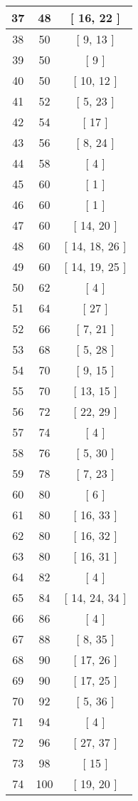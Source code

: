 \begin{center}
\begin{longtable}[H]{|| c c c ||}
37 & 48 & [ 16, 22 ]
\\\hline
38 & 50 & [ 9, 13 ]
\\\hline
39 & 50 & [ 9 ]
\\\hline
40 & 50 & [ 10, 12 ]
\\\hline
41 & 52 & [ 5, 23 ]
\\\hline
42 & 54 & [ 17 ]
\\\hline
43 & 56 & [ 8, 24 ]
\\\hline
44 & 58 & [ 4 ]
\\\hline
45 & 60 & [ 1 ]
\\\hline
46 & 60 & [ 1 ]
\\\hline
47 & 60 & [ 14, 20 ]
\\\hline
48 & 60 & [ 14, 18, 26 ]
\\\hline
49 & 60 & [ 14, 19, 25 ]
\\\hline
50 & 62 & [ 4 ]
\\\hline
51 & 64 & [ 27 ]
\\\hline
52 & 66 & [ 7, 21 ]
\\\hline
53 & 68 & [ 5, 28 ]
\\\hline
54 & 70 & [ 9, 15 ]
\\\hline
55 & 70 & [ 13, 15 ]
\\\hline
56 & 72 & [ 22, 29 ]
\\\hline
57 & 74 & [ 4 ]
\\\hline
58 & 76 & [ 5, 30 ]
\\\hline
59 & 78 & [ 7, 23 ]
\\\hline
60 & 80 & [ 6 ]
\\\hline
61 & 80 & [ 16, 33 ]
\\\hline
62 & 80 & [ 16, 32 ]
\\\hline
63 & 80 & [ 16, 31 ]
\\\hline
64 & 82 & [ 4 ]
\\\hline
65 & 84 & [ 14, 24, 34 ]
\\\hline
66 & 86 & [ 4 ]
\\\hline
67 & 88 & [ 8, 35 ]
\\\hline
68 & 90 & [ 17, 26 ]
\\\hline
69 & 90 & [ 17, 25 ]
\\\hline
70 & 92 & [ 5, 36 ]
\\\hline
71 & 94 & [ 4 ]
\\\hline
72 & 96 & [ 27, 37 ]
\\\hline
73 & 98 & [ 15 ]
\\\hline
74 & 100 & [ 19, 20 ]
\\\hline

\end{longtable}
\end{center}
